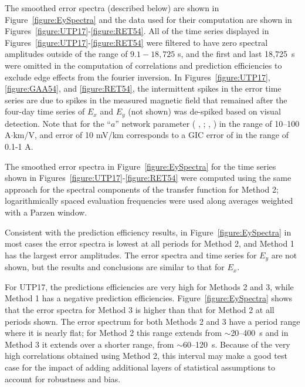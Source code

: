 \documentclass[12pt]{article}
\newcommand{\citeay}[1]{%
\citeauthor{#1}, \citeyear{#1}%
}
\begin{document}
The smoothed error spectra (described below) are shown in Figure~\ref{figure:EySpectra} and the data used for their computation are shown in Figures~\ref{figure:UTP17}-\ref{figure:RET54}.  All of the time series displayed in Figures~\ref{figure:UTP17}-\ref{figure:RET54} were filtered to have zero spectral amplitudes outside of the range of $9.1-18,725$ s, and the first and last 18,725~s were omitted in the computation of correlations and prediction efficiencies to exclude edge effects from the fourier inversion.  In Figures~\ref{figure:UTP17}, \ref{figure:GAA54}, and \ref{figure:RET54}, the intermittent spikes in the error time series are due to spikes in the measured magnetic field that remained after the four-day time series of $E_x$ and $E_y$ (not shown) was de-spiked based on visual detection.  Note that for the ``$a$'' network parameter (\citeay{Lehtinen1985}; \citeay{Pulkkinen2010}) in the range of 10--100 A$\cdot$km/V, and error of 10 mV/km corresponds to a GIC error of in the range of 0.1-1 A.

The smoothed error spectra in Figure~\ref{figure:EySpectra} for the time series shown in Figures~\ref{figure:UTP17}-\ref{figure:RET54} were computed using the same approach for the spectral components of the transfer function for Method 2; logarithmically spaced evaluation frequencies were used along averages weighted with a Parzen window.


Consistent with the prediction efficiency results, in Figure~\ref{figure:EySpectra} in most cases the error spectra is lowest at all periods for Method 2, and Method 1 has the largest error amplitudes. The error spectra and time series for $E_y$ are not shown, but the results and conclusions are similar to that for $E_x$. 

For UTP17, the predictions efficiencies are very high for Methods 2 and 3, while Method 1 has a negative prediction efficiencies.  Figure~\ref{figure:EySpectra} shows that the error spectra for Method 3 is higher than that for Method 2 at all periods shown.  The error spectrum for both Methods 2 and 3 have a period range where it is nearly flat; for Method 2 this range extends from $\sim$20--400~s and in Method 3 it extends over a shorter range, from $\sim$60--120~s.  Because of the very high correlations obtained using Method 2, this interval may make a good test case for the impact of adding additional layers of statistical assumptions to account for robustness and bias.
\end{document}

